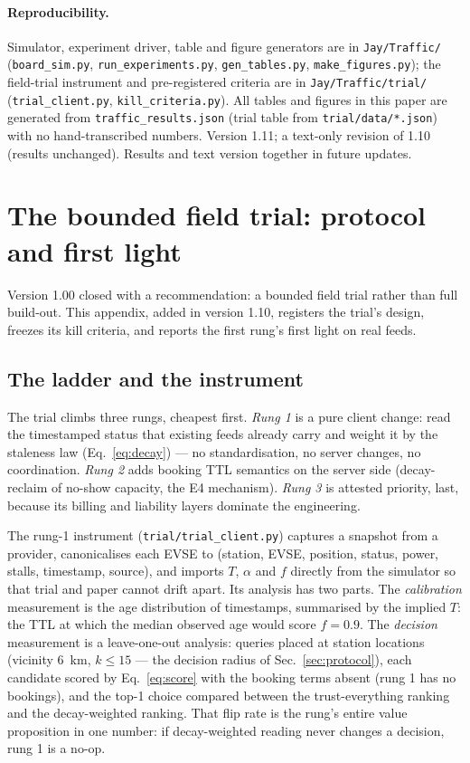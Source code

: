 \documentclass[twoside,twocolumn,usenatbib]{mnras}
\begin{document}
\paragraph{Reproducibility.}  Simulator, experiment driver, table
and figure generators are in \texttt{Jay/Traffic/}
(\texttt{board\_sim.py}, \texttt{run\_experiments.py},
\texttt{gen\_tables.py}, \texttt{make\_figures.py}); the field-trial
instrument and pre-registered criteria are in
\texttt{Jay/Traffic/trial/} (\texttt{trial\_client.py},
\texttt{kill\_criteria.py}).  All tables and
figures in this paper are generated from
\texttt{traffic\_results.json} (trial table from
\texttt{trial/data/*.json}) with no hand-transcribed numbers.
Version 1.11; a text-only revision of 1.10 (results unchanged).
Results and text version together in future updates.

\appendix

\section{The bounded field trial: protocol and first light}
\label{app:trial}

Version 1.00 closed with a recommendation: a bounded field trial
rather than full build-out.  This appendix, added in version 1.10,
registers the trial's design, freezes its kill criteria, and reports
the first rung's first light on real feeds.

\subsection{The ladder and the instrument}

The trial climbs three rungs, cheapest first.  \emph{Rung 1} is a
pure client change: read the timestamped status that existing feeds
already carry and weight it by the staleness law
(Eq.~\ref{eq:decay}) --- no standardisation, no server changes, no
coordination.  \emph{Rung 2} adds booking TTL semantics on the
server side (decay-reclaim of no-show capacity, the E4 mechanism).
\emph{Rung 3} is attested priority, last, because its billing and
liability layers dominate the engineering.

The rung-1 instrument (\texttt{trial/trial\_client.py}) captures a
snapshot from a provider, canonicalises each EVSE to (station,
EVSE, position, status, power, stalls, timestamp, source), and
imports $T$, $\alpha$ and $f$ directly from the simulator so that
trial and paper cannot drift apart.  Its analysis has two parts.
The \emph{calibration} measurement is the age distribution of
timestamps, summarised by the implied $T$: the TTL at which the
median observed age would score $f = 0.9$.  The \emph{decision}
measurement is a leave-one-out analysis: queries placed at station
locations (vicinity 6~km, $k \le 15$ --- the decision radius of
Sec.~\ref{sec:protocol}), each candidate scored by
Eq.~\ref{eq:score} with the booking terms absent (rung 1 has no
bookings), and the top-1 choice compared between the
trust-everything ranking and the decay-weighted ranking.  That flip
rate is the rung's entire value proposition in one number: if
decay-weighted reading never changes a decision, rung 1 is a no-op.
\end{document}
